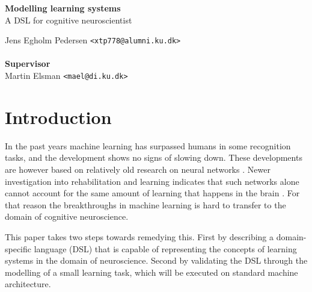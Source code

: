 \documentclass[a4paper,oneside]{memoir}
\begin{document}
    \thispagestyle{empty}
    \begin{adjustwidth}{-3cm}{-1.5cm}
    \vspace*{2.5cm}
    \textbf{\Huge Modelling learning systems} \\
    \vspace*{.1cm}
    {\Huge  A DSL for cognitive neuroscientist}\\
    \begin{tabbing}
    Jens Egholm Pedersen \hspace{1cm} \= \texttt{<xtp778@alumni.ku.dk>} \\
    \\[11cm]

    \textbf{\Large Supervisor} \\
    Martin Elsman \hspace{1cm} \texttt{<mael@di.ku.dk>}
    \end{tabbing}
    \end{adjustwidth}
    \newpage
    \ClearWallPaper


\section{Introduction}
In the past years machine learning has surpassed humans in some recognition
tasks, and the development shows no signs of slowing down.
These developments are however based on relatively old research on neural
networks \autocite{Nilsson2009, russel2007}.
Newer investigation into rehabilitation and learning indicates that such
networks alone cannot account for the same amount of learning that happens
in the brain \autocite{Mogensen2011, block2007, russel2007, Moravec98, dennett2017}.
For that reason the breakthroughs in machine learning is hard to transfer
to the domain of cognitive neuroscience.

This paper takes two steps towards remedying this.
First by describing a domain-specific language (DSL) that is capable of
representing the concepts of learning systems in the domain of neuroscience.
Second by validating the DSL through the modelling of a small learning
task, which will be executed on standard machine architecture.
\end{document}
